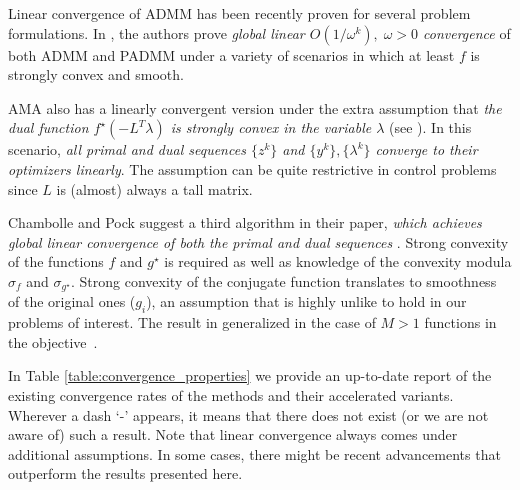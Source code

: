 \documentclass[openany]{now}
\begin{document}
Linear convergence of ADMM has been recently proven for several problem formulations. In \cite{deng2012global}, the authors prove \emph{global linear $O(1/\omega^k),\;\omega>0$ convergence} of both ADMM and PADMM under a variety of scenarios in which at least $f$ is strongly convex and smooth.

AMA also has a linearly convergent version under the extra assumption that \emph{the dual function $f^\star(-L^T\lambda)$ is strongly convex in the variable $\lambda$} (see \cite[Proposition~2]{ama}). In this scenario, \emph{all primal and dual sequences $\{z^k\}$ and $\{y^k\},\{\lambda^k\}$ converge to their optimizers linearly}. The assumption can be quite restrictive in control problems since $L$ is (almost) always a tall matrix.

Chambolle and Pock suggest a third algorithm in their paper, \emph{which achieves global linear convergence of both the primal and dual sequences} \cite[Theorem~3]{chamb}. Strong convexity of the functions $f$ and $g^\star$ is required as well as knowledge of the convexity modula $\sigma_f$ and $\sigma_{g^\star}$. Strong convexity of the conjugate function translates to smoothness of the original ones ($g_i$), an assumption that is highly unlike to hold in our problems of interest. The result in generalized in the case of $M>1$ functions in the objective~\cite[Theorem~24]{bot2013convergence}.

In Table \ref{table:convergence_properties} we provide an up-to-date report of the existing convergence rates of the methods and their accelerated variants. Wherever a dash `-' appears, it means that there does not exist (or we are not aware of) such a result. Note that linear convergence always comes under additional assumptions. In some cases, there might be recent advancements that outperform the results presented here.
\end{document}
